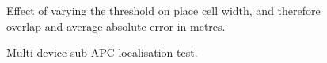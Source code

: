 \begin{figure}[h!]
\centering
\setlength{}
	\setlength{} 
\caption{Effect of varying the threshold on place cell width, and therefore overlap and average absolute error in metres.}
\label{fig:threshEval}
\end{figure}


\begin{figure}
\centering
\setlength{}
	\setlength{}
		
\caption{Multi-device sub-APC localisation test.}
\label{fig:multiDevice}
\end{figure}


%		



%	
%
%		


